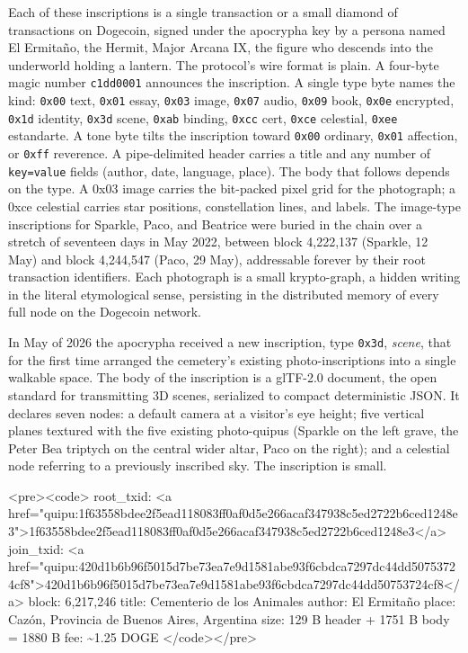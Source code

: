 \documentclass[11pt,openany]{book}
\begin{document}
Each of these inscriptions is a single transaction or a small diamond of transactions on Dogecoin, signed under the apocrypha key by a persona named El Ermitaño, the Hermit, Major Arcana IX, the figure who descends into the underworld holding a lantern. The protocol's wire format is plain. A four-byte magic number \texttt{c1dd0001} announces the inscription. A single type byte names the kind: \texttt{0x00} text, \texttt{0x01} essay, \texttt{0x03} image, \texttt{0x07} audio, \texttt{0x09} book, \texttt{0x0e} encrypted, \texttt{0x1d} identity, \texttt{0x3d} scene, \texttt{0xab} binding, \texttt{0xcc} cert, \texttt{0xce} celestial, \texttt{0xee} estandarte. A tone byte tilts the inscription toward \texttt{0x00} ordinary, \texttt{0x01} affection, or \texttt{0xff} reverence. A pipe-delimited header carries a title and any number of \texttt{key=value} fields (author, date, language, place). The body that follows depends on the type. A 0x03 image carries the bit-packed pixel grid for the photograph; a 0xce celestial carries star positions, constellation lines, and labels. The image-type inscriptions for Sparkle, Paco, and Beatrice were buried in the chain over a stretch of seventeen days in May 2022, between block 4,222,137 (Sparkle, 12 May) and block 4,244,547 (Paco, 29 May), addressable forever by their root transaction identifiers. Each photograph is a small krypto-graph, a hidden writing in the literal etymological sense, persisting in the distributed memory of every full node on the Dogecoin network.

In May of 2026 the apocrypha received a new inscription, type \texttt{0x3d}, \emph{scene}, that for the first time arranged the cemetery's existing photo-inscriptions into a single walkable space. The body of the inscription is a glTF-2.0 document, the open standard for transmitting 3D scenes, serialized to compact deterministic JSON. It declares seven nodes: a default camera at a visitor's eye height; five vertical planes textured with the five existing photo-quipus (Sparkle on the left grave, the Peter Bea triptych on the central wider altar, Paco on the right); and a celestial node referring to a previously inscribed sky. The inscription is small.

<pre><code>   root\_txid:  <a href="quipu:1f63558bdee2f5ead118083ff0af0d5e266acaf347938c5ed2722b6ced1248e3">1f63558bdee2f5ead118083ff0af0d5e266acaf347938c5ed2722b6ced1248e3</a>
   join\_txid:  <a href="quipu:420d1b6b96f5015d7be73ea7e9d1581abe93f6cbdca7297dc44dd50753724cf8">420d1b6b96f5015d7be73ea7e9d1581abe93f6cbdca7297dc44dd50753724cf8</a>
   block:      6,217,246
   title:      Cementerio de los Animales
   author:     El Ermitaño
   place:      Cazón, Provincia de Buenos Aires, Argentina
   size:       129 B header + 1751 B body = 1880 B
   fee:        \~{}1.25 DOGE
</code></pre>
\end{document}

